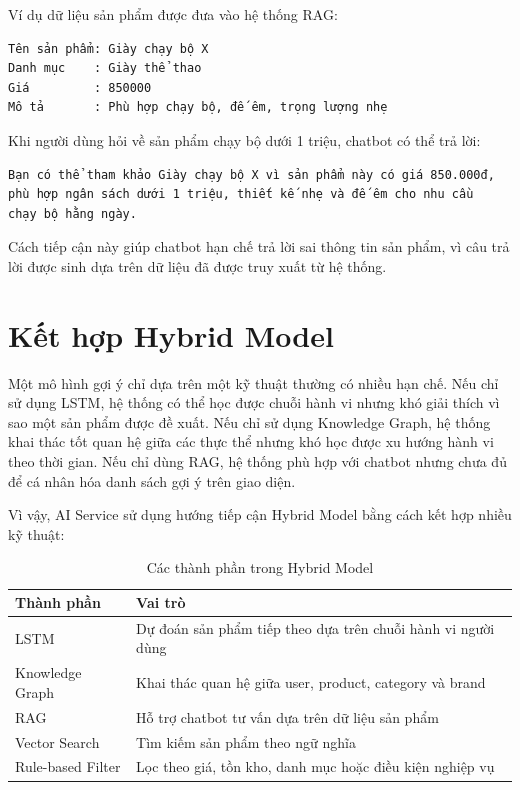 \documentclass[../main.tex]{subfiles}
\begin{document}
Ví dụ dữ liệu sản phẩm được đưa vào hệ thống RAG:

\begin{verbatim}
Tên sản phẩm: Giày chạy bộ X
Danh mục    : Giày thể thao
Giá         : 850000
Mô tả       : Phù hợp chạy bộ, đế êm, trọng lượng nhẹ
\end{verbatim}

Khi người dùng hỏi về sản phẩm chạy bộ dưới 1 triệu, chatbot có thể trả lời:

\begin{verbatim}
Bạn có thể tham khảo Giày chạy bộ X vì sản phẩm này có giá 850.000đ,
phù hợp ngân sách dưới 1 triệu, thiết kế nhẹ và đế êm cho nhu cầu
chạy bộ hằng ngày.
\end{verbatim}

Cách tiếp cận này giúp chatbot hạn chế trả lời sai thông tin sản phẩm, vì câu trả lời được sinh dựa trên dữ liệu đã được truy xuất từ hệ thống.

\section{Kết hợp Hybrid Model}

Một mô hình gợi ý chỉ dựa trên một kỹ thuật thường có nhiều hạn chế. Nếu chỉ sử dụng LSTM, hệ thống có thể học được chuỗi hành vi nhưng khó giải thích vì sao một sản phẩm được đề xuất. Nếu chỉ sử dụng Knowledge Graph, hệ thống khai thác tốt quan hệ giữa các thực thể nhưng khó học được xu hướng hành vi theo thời gian. Nếu chỉ dùng RAG, hệ thống phù hợp với chatbot nhưng chưa đủ để cá nhân hóa danh sách gợi ý trên giao diện.

Vì vậy, AI Service sử dụng hướng tiếp cận Hybrid Model bằng cách kết hợp nhiều kỹ thuật:

\begin{table}[H]
    \centering
    \caption{Các thành phần trong Hybrid Model}
    \label{tab:chapter3-hybrid-components}
    \begin{tabular}{|p{}|p{}|}
        \hline
        \rowcolor{primary!35}
        \textbf{Thành phần} & \textbf{Vai trò} \\
\hline
LSTM & Dự đoán sản phẩm tiếp theo dựa trên chuỗi hành vi người dùng \\
\hline
Knowledge Graph & Khai thác quan hệ giữa user, product, category và brand \\
\hline
RAG & Hỗ trợ chatbot tư vấn dựa trên dữ liệu sản phẩm \\
\hline
Vector Search & Tìm kiếm sản phẩm theo ngữ nghĩa \\
\hline
Rule-based Filter & Lọc theo giá, tồn kho, danh mục hoặc điều kiện nghiệp vụ \\
\hline
\end{tabular}
\end{table}
\end{document}
